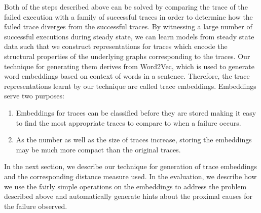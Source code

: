 Both of the steps described above can be solved by comparing the trace of the failed execution with a family of successful traces in order to determine how the failed trace diverges from the successful traces. By witnessing a large number of successful executions during steady state, we can learn models from steady state data such that we construct representations for traces which encode the structural properties of the underlying graphs corresponding to the traces. Our technique for generating them derives from Word2Vec, which is used to generate word embeddings based on context of words in a sentence. Therefore, the trace representations learnt by our technique are called trace embeddings. Embeddings  serve two purposes:
\begin{enumerate}
\item Embeddings for traces can be classified before they are stored making it easy to find the most appropriate traces to compare to when a failure occurs.
\item As the number as well as the size of traces increase, storing the embeddings may be much more compact than the original traces. 
\end{enumerate}

In the next section, we describe our technique for generation of trace embeddings and the corresponding distance measure used. In the evaluation, we describe how we use the fairly simple operations on the embeddings to address the problem described above and automatically generate hints about the proximal causes for the failure observed. 
